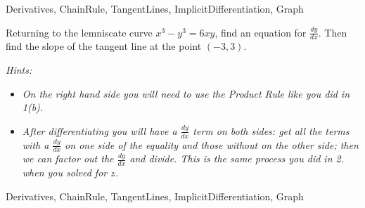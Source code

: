 

	
\begin{tagblock}{Derivatives, ChainRule, TangentLines, ImplicitDifferentiation, Graph}
\begin{question}
	

Returning to the lemniscate curve $x^3-y^3=6xy$, find an equation for $\frac{dy}{dx}$.   Then find the slope of the tangent line at the point $(-3,3)$.  

\emph{Hints:}
\begin{itemize}
\item \emph{On the right hand side you will need to use the Product Rule like you did in 1(b).}
\item \emph{After differentiating you will have a $\frac{dy}{dx}$ term on both sides: get all the terms with a $\frac{dy}{dx}$ on one side of the equality and those without on the other side; then we can factor out the $\frac{dy}{dx}$ and divide.  This is the same process you did in 2. when you solved for $z$. }  
\end{itemize}



	
\begin{tags}
	    Derivatives, ChainRule, TangentLines, ImplicitDifferentiation, Graph
\end{tags}
	
\begin{diary}
\end{diary}
	
\begin{solution}
	   
\end{solution}
	
\end{question}

\end{tagblock}



